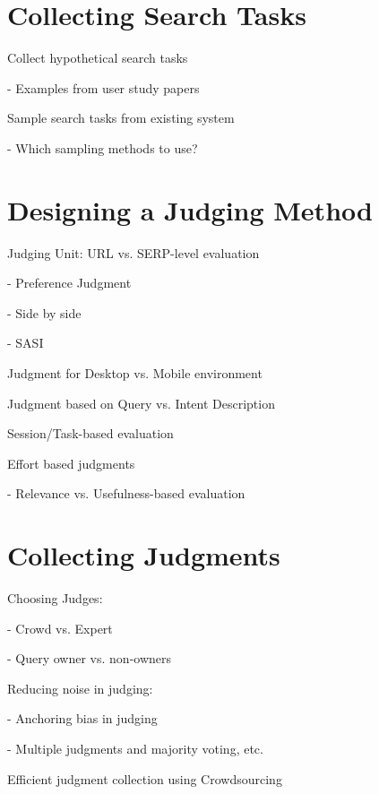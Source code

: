 \documentclass[openany]{now} %
\newcommand{\newpar}{\bigskip\noindent}
\begin{document}
\section{Collecting Search Tasks}

Collect hypothetical search tasks

- Examples from user study papers

\newpar
Sample search tasks from existing system

- Which sampling methods to use? \cite{Baeza-Yates:2015}

\section{Designing a Judging Method}

Judging Unit: URL vs. SERP-level evaluation

- Preference Judgment  \cite{Chandar2013} \cite{CarteretteBCD08}

- Side by side \cite{Thomas2006} \cite{Kim:2013}

- SASI \cite{Bailey2010} 

\newpar
Judgment for Desktop vs. Mobile environment \cite{Verma:2016:CRMD}

\newpar
Judgment based on Query vs. Intent Description \cite{Yilmaz:2014:EID}

\newpar
Session/Task-based evaluation \cite{Moraveji:2011} \cite{Xu:2009}

\newpar
Effort based judgments \cite{Yilmaz:2014} \cite{Verma:2016:EBJ}

- Relevance vs. Usefulness-based evaluation 

\section{Collecting Judgments}

Choosing Judges: 

- Crowd vs. Expert \cite{Kazai:2013} \cite{Alonso20121053}

- Query owner vs. non-owners \cite{Chouldechova:2013}

\newpar
Reducing noise in judging: 

- Anchoring bias in judging \cite{Shokouhi:2015}

- Multiple judgments and majority voting, etc. \cite{Venanzi:2014}

\cite{aroyo2013measuring} \cite{aroyo2013crowd}

\newpar
Efficient judgment collection using Crowdsourcing
\end{document}
